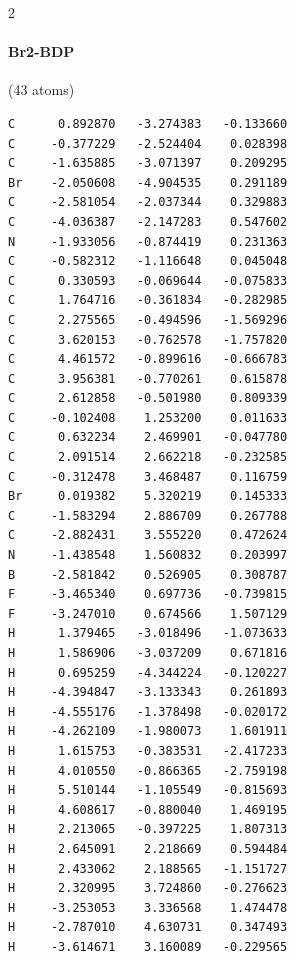 \begin{multicols}{2}
\paragraph{Br2-BDP} (43 atoms)
{\scriptsize\linespread{1}\selectfont\begin{verbatim}
C      0.892870   -3.274383   -0.133660
C     -0.377229   -2.524404    0.028398
C     -1.635885   -3.071397    0.209295
Br    -2.050608   -4.904535    0.291189
C     -2.581054   -2.037344    0.329883
C     -4.036387   -2.147283    0.547602
N     -1.933056   -0.874419    0.231363
C     -0.582312   -1.116648    0.045048
C      0.330593   -0.069644   -0.075833
C      1.764716   -0.361834   -0.282985
C      2.275565   -0.494596   -1.569296
C      3.620153   -0.762578   -1.757820
C      4.461572   -0.899616   -0.666783
C      3.956381   -0.770261    0.615878
C      2.612858   -0.501980    0.809339
C     -0.102408    1.253200    0.011633
C      0.632234    2.469901   -0.047780
C      2.091514    2.662218   -0.232585
C     -0.312478    3.468487    0.116759
Br     0.019382    5.320219    0.145333
C     -1.583294    2.886709    0.267788
C     -2.882431    3.555220    0.472624
N     -1.438548    1.560832    0.203997
B     -2.581842    0.526905    0.308787
F     -3.465340    0.697736   -0.739815
F     -3.247010    0.674566    1.507129
H      1.379465   -3.018496   -1.073633
H      1.586906   -3.037209    0.671816
H      0.695259   -4.344224   -0.120227
H     -4.394847   -3.133343    0.261893
H     -4.555176   -1.378498   -0.020172
H     -4.262109   -1.980073    1.601911
H      1.615753   -0.383531   -2.417233
H      4.010550   -0.866365   -2.759198
H      5.510144   -1.105549   -0.815693
H      4.608617   -0.880040    1.469195
H      2.213065   -0.397225    1.807313
H      2.645091    2.218669    0.594484
H      2.433062    2.188565   -1.151727
H      2.320995    3.724860   -0.276623
H     -3.253053    3.336568    1.474478
H     -2.787010    4.630731    0.347493
H     -3.614671    3.160089   -0.229565
\end{verbatim}}

\end{multicols}
